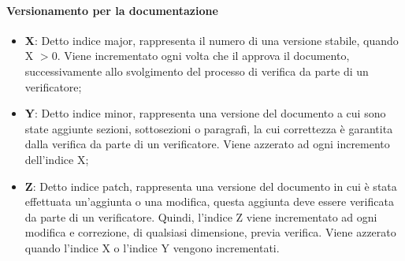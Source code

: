 \paragraph{Versionamento per la documentazione}
\begin{itemize}
	\item \textbf{X}: Detto indice major, rappresenta il numero di una versione stabile, quando X $> 0$.
	Viene incrementato ogni volta che il \Responsabile{} approva il documento, successivamente allo svolgimento del processo di verifica da parte di un verificatore;
	\item \textbf{Y}: Detto indice minor, rappresenta una versione del documento a cui sono state aggiunte sezioni, sottosezioni o paragrafi, la cui correttezza è garantita dalla verifica da parte di un verificatore. 
	Viene azzerato ad ogni incremento dell'indice X;
	\item \textbf{Z}: Detto indice patch, rappresenta una versione del documento in cui è stata effettuata un'aggiunta o una modifica, questa aggiunta deve essere verificata da parte di un verificatore.
	Quindi, l'indice Z viene incrementato ad ogni modifica e correzione, di qualsiasi dimensione, previa verifica.
	Viene azzerato quando l'indice X o l'indice Y vengono incrementati.
\end{itemize}

